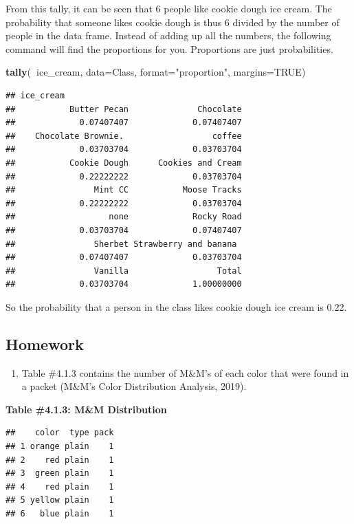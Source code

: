 \documentclass[
]{book}
\newenvironment{Shaded}{\begin{snugshade}}{\end{snugshade}}
\newcommand{\DataTypeTok}[1]{\textcolor[rgb]{0.13,0.29,0.53}{#1}}
\newcommand{\KeywordTok}[1]{\textcolor[rgb]{0.13,0.29,0.53}{\textbf{#1}}}
\newcommand{\NormalTok}[1]{#1}
\newcommand{\OperatorTok}[1]{\textcolor[rgb]{0.81,0.36,0.00}{\textbf{#1}}}
\newcommand{\OtherTok}[1]{\textcolor[rgb]{0.56,0.35,0.01}{#1}}
\newcommand{\StringTok}[1]{\textcolor[rgb]{0.31,0.60,0.02}{#1}}
\providecommand{\tightlist}{%
  \setlength{\itemsep}{0pt}\setlength{\parskip}{0pt}}
\begin{document}
From this tally, it can be seen that 6 people like cookie dough ice cream. The probability that someone likes cookie dough is thus 6 divided by the number of people in the data frame. Instead of adding up all the numbers, the following command will find the proportions for you. Proportions are just probabilities.

\begin{Shaded}
\begin{Highlighting}[]
\KeywordTok{tally}\NormalTok{(}\OperatorTok{~}\NormalTok{ice_cream, }\DataTypeTok{data=}\NormalTok{Class, }\DataTypeTok{format=}\StringTok{"proportion"}\NormalTok{, }\DataTypeTok{margins=}\OtherTok{TRUE}\NormalTok{)}
\end{Highlighting}
\end{Shaded}

\begin{verbatim}
## ice_cream
##           Butter Pecan              Chocolate 
##             0.07407407             0.07407407 
##    Chocolate Brownie.                  coffee 
##             0.03703704             0.03703704 
##           Cookie Dough      Cookies and Cream 
##             0.22222222             0.03703704 
##                Mint CC           Moose Tracks 
##             0.22222222             0.03703704 
##                   none             Rocky Road 
##             0.03703704             0.07407407 
##                Sherbet Strawberry and banana  
##             0.07407407             0.03703704 
##                Vanilla                  Total 
##             0.03703704             1.00000000
\end{verbatim}

So the probability that a person in the class likes cookie dough ice cream is 0.22.

\hypertarget{homework-6}{%
\subsection{Homework}\label{homework-6}}

\begin{enumerate}
\def\labelenumi{\arabic{enumi}.}
\tightlist
\item
  Table \#4.1.3 contains the number of M\&M's of each color that were found in a packet (M\&M's Color Distribution Analysis, 2019).
\end{enumerate}

\textbf{Table \#4.1.3: M\&M Distribution}

\begin{verbatim}
##    color  type pack
## 1 orange plain    1
## 2    red plain    1
## 3  green plain    1
## 4    red plain    1
## 5 yellow plain    1
## 6   blue plain    1
\end{verbatim}
\end{document}
